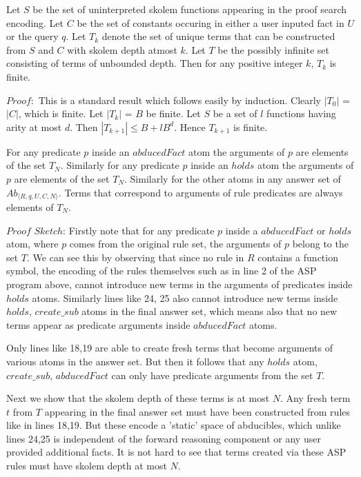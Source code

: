 \documentclass[sigconf]{acmart}
\begin{document}
\begin{lemma}
Let $S$ be the set of uninterpreted skolem functions appearing in the proof
search encoding. Let $C$ be the set of constants occuring in either a user
inputed fact in $U$ or the query $q$. Let $T_{k}$ denote the set of unique
terms that can be constructed from $S$ and $C$ with skolem depth atmost
$k$. Let $T$ be the possibly infinite set consisting of terms of unbounded
depth. Then for any positive integer $k$, $T_{k}$ is finite. 
\end{lemma}

$Proof:$ This is a standard result which follows easily by induction. Clearly $|T_{0}|$ = $|C|$, which is finite. Let $|T_{k}|$ = $B$ be finite. Let $S$ be a set of $l$ functions having arity at most $d$. Then $|T_{k+1}|\leq B + lB^{d}$. Hence $T_{k+1}$ is finite.  

\begin{lemma}
 For any predicate $p$ inside an $abducedFact$ atom the arguments of $p$ are elements of the set $T_{N}$. Similarly for any predicate $p$ inside an $holds$ atom the arguments of $p$ are elements of the set $T_{N}$. Similarly for the other atoms in any answer set of $Ab_{\langle R,q,U,C,N \rangle}$. Terms that correspond to arguments of rule predicates are always elements of $T_{N}$.
\end{lemma}

$Proof$ $Sketch$: Firstly note that for any predicate $p$ inside a
$abducedFact$ or $holds$ atom, where $p$ comes from the original rule set, the
arguments of $p$ belong to the set $T$. We can see this by observing that
since no rule in $R$ contains a function symbol, the encoding of the rules
themselves such as in line 2 of the ASP program above, cannot introduce new
terms in the arguments of predicates inside $holds$ atoms. Similarly lines
like 24, 25 also cannot introduce new terms inside $holds$, $create\_sub$
atoms in the final answer set, which means also that no new terms appear as
predicate arguments inside $abducedFact$ atoms. 

Only lines like 18,19 are able to create fresh terms that become arguments of
various atoms in the answer set. But then it follows that any $holds$ atom,
$create\_sub$, $abducedFact$ can only have predicate arguments from the set $T$.

Next we show that the skolem depth of these terms is at most $N$. Any fresh
term $t$ from $T$ appearing in the final answer set must have been constructed
from rules like in lines 18,19. But these encode a 'static' space of
abducibles, which unlike lines 24,25 is independent of the forward reasoning
component or any user provided additional facts. It is not hard to see that
terms created via these ASP rules must have skolem depth at most $N$. 
\end{document}
